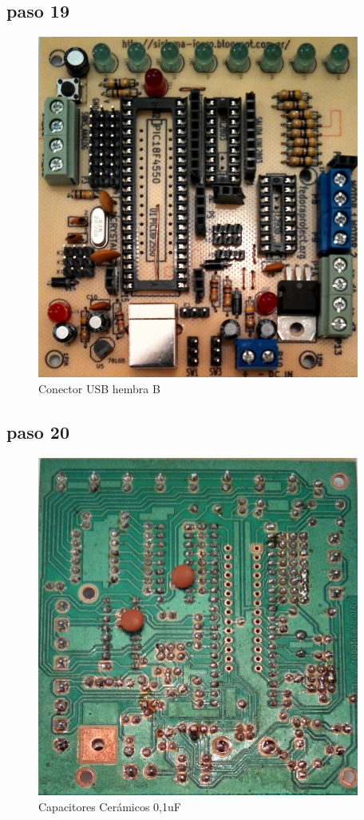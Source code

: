 \documentclass[letterpaper,10pt,english]{sphinxmanual}
\begin{document}
\subsection{paso 19}
\label{np07:paso-19}\begin{figure}[htbp]
\centering
\capstart

\includegraphics[width=300pt]{19b.jpg}
\caption{Conector USB hembra B}\end{figure}
\newpage

\subsection{paso 20}
\label{np07:paso-20}\begin{figure}[htbp]
\centering
\capstart

\includegraphics[width=300pt]{20b.jpg}
\caption{Capacitores Cerámicos 0,1uF}\end{figure}
\newpage
\end{document}
